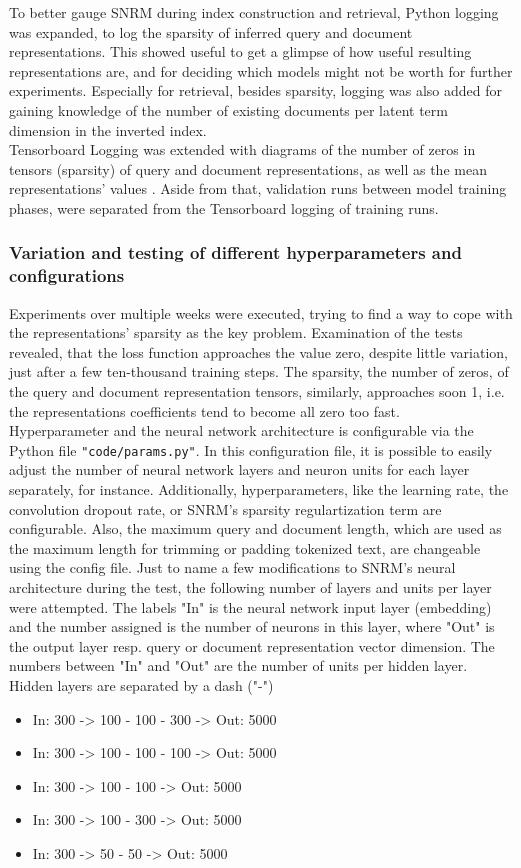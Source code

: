 To better gauge SNRM during index construction and retrieval, Python logging was expanded,
    to log the sparsity of inferred query and document representations.
This showed useful to get a glimpse of how useful resulting representations are, and for deciding
    which models might not be worth for further experiments.
Especially for retrieval, besides sparsity, logging was also added for gaining knowledge of
    the number of existing documents per latent term dimension in the inverted index. \\
Tensorboard Logging was extended with diagrams of the number of zeros in tensors (sparsity) of 
    query and document representations, as well as the mean representations' values .
Aside from that, validation runs between model training phases, were separated from the Tensorboard logging 
    of training runs.

\subsubsection*{Variation and testing of different hyperparameters and configurations}
Experiments over multiple weeks were executed, trying to find a way to cope with the representations' sparsity 
    as the key problem.
Examination of the tests revealed, that the loss function approaches the value zero, 
    despite little variation, just after a few ten-thousand training steps.
The sparsity, the number of zeros, of the query and document representation tensors, similarly, 
    approaches soon 1, i.e. the representations coefficients tend to become all zero too fast.\\
Hyperparameter and the neural network architecture is configurable via the Python file \verb|"code/params.py"|.
In this configuration file, it is possible to easily adjust the number of neural network layers and neuron units
    for each layer separately, for instance.
Additionally, hyperparameters, like the learning rate, the convolution dropout rate, or SNRM's sparsity regulartization term
    are configurable.
Also, the maximum query and document length, which are used as the maximum length for trimming or padding tokenized text,
    are changeable using the config file.
Just to name a few modifications to SNRM's neural architecture during the test, the following number of layers and units per layer
    were attempted.
The labels "In" is the neural network input layer (embedding) and the number assigned is the number of neurons in this layer, 
    where "Out" is the output layer resp. query or document representation vector dimension.
The numbers between "In" and "Out" are the number of units per hidden layer. 
Hidden layers are separated by a dash ("-")
\begin{itemize}
    \item In: 300 -> 100 - 100 - 300 -> Out: 5000
    \item In: 300 -> 100 - 100 - 100 -> Out: 5000
    \item In: 300 -> 100 - 100 -> Out: 5000
    \item In: 300 -> 100 - 300 -> Out: 5000
    \item In: 300 -> 50 - 50 -> Out: 5000
\end{itemize}

